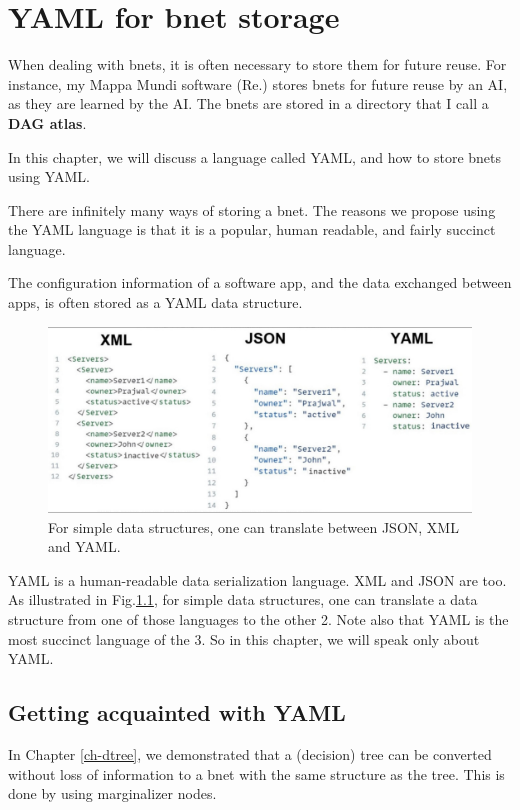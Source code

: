\chapter{ YAML for bnet storage}

When dealing with bnets,
it is often necessary to store
them for future reuse.
 For instance, my Mappa Mundi
software (Re.\cite{mappa-mundi}) stores
bnets
for future reuse by an AI,
as they are learned by the AI. The bnets are stored in a directory that I call a {\bf DAG atlas}.

In this chapter, we will discuss a language called YAML, 
and how to store bnets using YAML.



There are infinitely many ways of storing a bnet. 
The reasons we propose using the YAML
language is that it is a popular,
human readable, and fairly succinct language.

The configuration information of a software app, and the data exchanged between apps,  is often stored as a  YAML data structure.

\begin{figure}[h!]
\centering
\includegraphics[width=6in]
{yaml/json-xml-yaml.jpg}
\caption{For simple data structures,
one can translate between JSON, XML and YAML.}
\label{fig-json-xml-yaml}
\end{figure}

YAML is a human-readable data serialization language.
XML and JSON are too.
As illustrated in Fig.\ref{fig-json-xml-yaml}, for simple data structures, one can translate a data structure
from one of those languages to the other 2. 
Note also that
YAML is the most succinct 
language of the 3.
So in this chapter, we will speak only about YAML.

\section{Getting acquainted with YAML}
In Chapter \ref{ch-dtree},
we demonstrated that a (decision) tree
can be converted without loss of
information to a bnet with the
same structure as the tree.
This is done by using marginalizer nodes.

